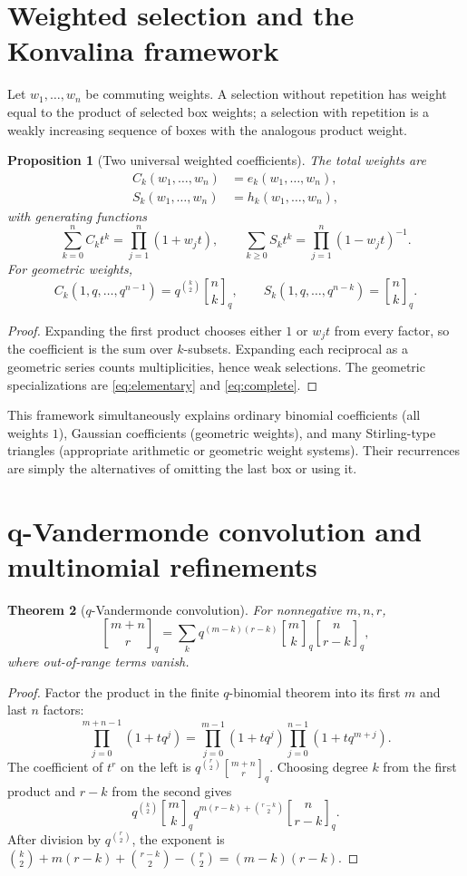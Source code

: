\documentclass[11pt]{article}
\numberwithin{equation}{section}
\newtheorem{theorem}{Theorem}[section]
\newtheorem{proposition}[theorem]{Proposition}
\theoremstyle{definition}
\newcommand{\qbinom}[2]{\genfrac{[}{]}{0pt}{}{#1}{#2}_{q}}
\begin{document}
\section{Weighted selection and the Konvalina framework}
Let $w_1,\ldots,w_n$ be commuting weights.  A selection without repetition has weight equal to the product of selected box weights; a selection with repetition is a weakly increasing sequence of boxes with the analogous product weight.

\begin{proposition}[Two universal weighted coefficients]
The total weights are
\begin{align}
C_k(w_1,\ldots,w_n)&=e_k(w_1,\ldots,w_n),\\
S_k(w_1,\ldots,w_n)&=h_k(w_1,\ldots,w_n),
\end{align}
with generating functions
\[
\sum_{k=0}^n C_k t^k=\prod_{j=1}^n(1+w_jt),
\qquad
\sum_{k\ge0}S_k t^k=\prod_{j=1}^n(1-w_jt)^{-1}.
\]
For geometric weights,
\[
C_k(1,q,\ldots,q^{n-1})=q^{\binom k2}\qbinom nk,
\qquad
S_k(1,q,\ldots,q^{n-k})=\qbinom nk.
\]
\end{proposition}
\begin{proof}
Expanding the first product chooses either $1$ or $w_jt$ from every factor, so the coefficient is the sum over $k$-subsets.  Expanding each reciprocal as a geometric series counts multiplicities, hence weak selections.  The geometric specializations are \eqref{eq:elementary} and \eqref{eq:complete}.
\end{proof}

This framework simultaneously explains ordinary binomial coefficients (all weights $1$), Gaussian coefficients (geometric weights), and many Stirling-type triangles (appropriate arithmetic or geometric weight systems).  Their recurrences are simply the alternatives of omitting the last box or using it.

\section{q-Vandermonde convolution and multinomial refinements}
\begin{theorem}[$q$-Vandermonde convolution]
For nonnegative $m,n,r$,
\begin{equation}
\genfrac{[}{]}{0pt}{}{m+n}{r}_q
=\sum_k q^{(m-k)(r-k)}
\genfrac{[}{]}{0pt}{}{m}{k}_q
\genfrac{[}{]}{0pt}{}{n}{r-k}_q,\label{eq:qvand}
\end{equation}
where out-of-range terms vanish.
\end{theorem}
\begin{proof}
Factor the product in the finite $q$-binomial theorem into its first $m$ and last $n$ factors:
\[
\prod_{j=0}^{m+n-1}(1+tq^j)
=\prod_{j=0}^{m-1}(1+tq^j)
 \prod_{j=0}^{n-1}(1+tq^{m+j}).
\]
The coefficient of $t^r$ on the left is $q^{\binom r2}\genfrac{[}{]}{0pt}{}{m+n}{r}_q$.  Choosing degree $k$ from the first product and $r-k$ from the second gives
\[
q^{\binom k2}\genfrac{[}{]}{0pt}{}{m}{k}_q
q^{m(r-k)+\binom{r-k}2}\genfrac{[}{]}{0pt}{}{n}{r-k}_q.
\]
After division by $q^{\binom r2}$, the exponent is
$\binom k2+m(r-k)+\binom{r-k}2-\binom r2=(m-k)(r-k)$.
\end{proof}
\end{document}
